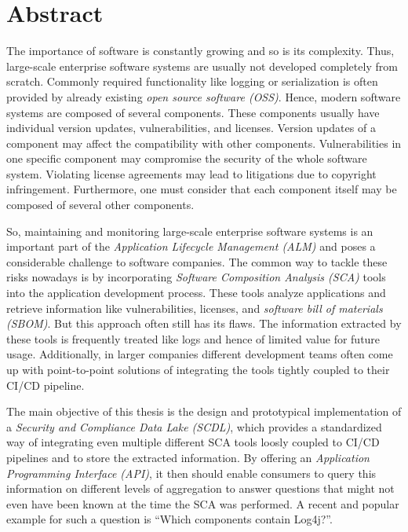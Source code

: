 
\titlespacing*{\chapter}{0pt}{0pt}{40pt}
\pagestyle{plain}
\chapter*{Abstract}
The importance of software is constantly growing and so is its complexity. Thus, large-scale enterprise software systems are usually not developed completely from scratch. Commonly required functionality like logging or serialization is often provided by already existing \textit{open source software (OSS)}. Hence, modern software systems are composed of several components. These components usually have individual version updates, vulnerabilities, and licenses. Version updates of a component may affect the compatibility with other components. Vulnerabilities in one specific component may compromise the security of the whole software system. Violating license agreements may lead to litigations due to copyright infringement. Furthermore, one must consider that each component itself may be composed of several other components.\par
So, maintaining and monitoring large-scale enterprise software systems is an important part of the \textit{Application Lifecycle Management (ALM)} and poses a considerable challenge to software companies. The common way to tackle these risks nowadays is by incorporating \textit{Software Composition Analysis (SCA)} tools into the application development process. These tools analyze applications and retrieve information like vulnerabilities, licenses, and \textit{software bill of materials (SBOM)}. But this approach often still has its flaws. The information extracted by these tools is frequently treated like logs and hence of limited value for future usage. Additionally, in larger companies different development teams often come up with point-to-point solutions of integrating the tools tightly coupled to their CI/CD pipeline.\par
The main objective of this thesis is the design and prototypical implementation of a \textit{Security and Compliance Data Lake (SCDL)}, which provides a standardized way of integrating even multiple different SCA tools loosly coupled to CI/CD pipelines and to store the extracted information. By offering an \textit{Application Programming Interface (API)}, it then should enable consumers to query this information on different levels of aggregation to answer questions that might not even have been known at the time the SCA was performed. A recent and popular example for such a question is \enquote{Which components contain Log4j?}.\par
